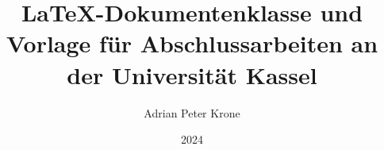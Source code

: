 \documentclass[
  ukcolor,       %
  BCOR=12mm,     %
  parskip=half,  %
  open=any,      %
  cleardoublepage=plain,  %
]{agethesis}
\author{Adrian Peter Krone}
\title{\LaTeX-Dokumentenklasse und Vorlage für Abschlussarbeiten an der Universität Kassel}
\date{2024}
\begin{document}
\frontmatter

\maketitle

\makecorrectorpage

\tableofcontents

\mainmatter





\appendix


\backmatter
\printbibliography

\cleardoublepage

\end{document}
